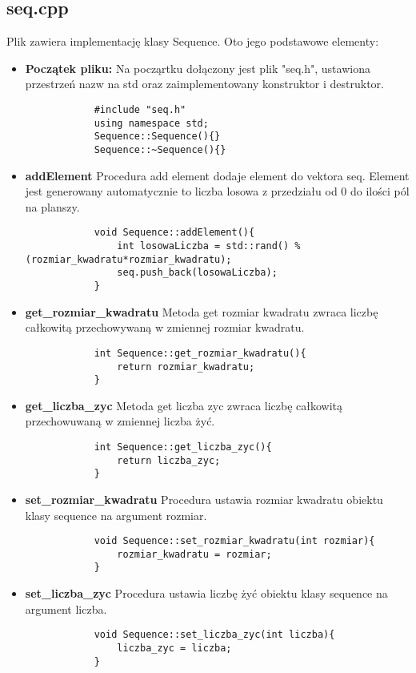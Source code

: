 \documentclass[]{report}
\begin{document}
	\subsection*{seq.cpp}
	Plik zawiera implementację klasy Sequence. Oto jego podstawowe elementy:
	\begin{itemize}
		\item \textbf{Początek pliku:} Na począrtku dołączony jest plik "seq.h", ustawiona przestrzeń nazw na std oraz zaimplementowany konstruktor i destruktor.
		\begin{lstlisting}
			#include "seq.h"
			using namespace std;
			Sequence::Sequence(){}
			Sequence::~Sequence(){}
		\end{lstlisting}
		\item \textbf{addElement} Procedura add element dodaje element do vektora seq. Element jest generowany automatycznie to liczba losowa z przedziału od 0 do ilości pól na planszy.
		\begin{lstlisting}
			void Sequence::addElement(){
				int losowaLiczba = std::rand() % (rozmiar_kwadratu*rozmiar_kwadratu);
				seq.push_back(losowaLiczba);
			}
		\end{lstlisting}
		\item \textbf{get\_rozmiar\_kwadratu} Metoda get rozmiar kwadratu zwraca liczbę całkowitą przechowywaną w zmiennej rozmiar kwadratu.
		\begin{lstlisting}
			int Sequence::get_rozmiar_kwadratu(){
				return rozmiar_kwadratu;
			}
		\end{lstlisting}
		\item \textbf{get\_liczba\_zyc} Metoda get liczba zyc zwraca liczbę całkowitą przechowuwaną w zmiennej liczba żyć.
		\begin{lstlisting}
			int Sequence::get_liczba_zyc(){
				return liczba_zyc;
			}
		\end{lstlisting}
		\item \textbf{set\_rozmiar\_kwadratu} Procedura ustawia rozmiar kwadratu obiektu klasy sequence na argument rozmiar. 
		\begin{lstlisting}
			void Sequence::set_rozmiar_kwadratu(int rozmiar){
				rozmiar_kwadratu = rozmiar;
			}
		\end{lstlisting}
		\item \textbf{set\_liczba\_zyc} Procedura ustawia liczbę żyć obiektu klasy sequence na argument liczba. 
		\begin{lstlisting}
			void Sequence::set_liczba_zyc(int liczba){
				liczba_zyc = liczba;
			}
		\end{lstlisting}
	\end{itemize}
	
\end{document}
